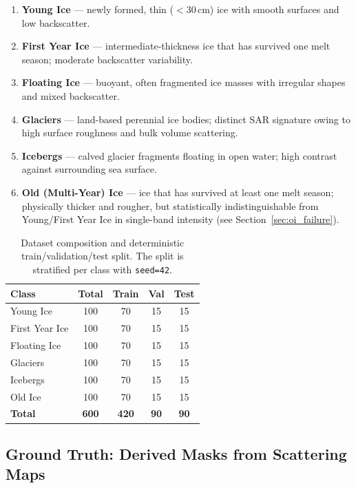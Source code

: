 \documentclass[remotesensing,article,accept,moreauthors,pdftex]{Definitions/mdpi}
\begin{document}
\begin{enumerate}[leftmargin=*,label=\arabic*.]
  \item \textbf{Young Ice} — newly formed, thin ($<$30\,cm) ice with smooth surfaces and low backscatter.
  \item \textbf{First Year Ice} — intermediate-thickness ice that has survived one melt season; moderate backscatter variability.
  \item \textbf{Floating Ice} — buoyant, often fragmented ice masses with irregular shapes and mixed backscatter.
  \item \textbf{Glaciers} — land-based perennial ice bodies; distinct SAR signature owing to high surface roughness and bulk volume scattering.
  \item \textbf{Icebergs} — calved glacier fragments floating in open water; high contrast against surrounding sea surface.
  \item \textbf{Old (Multi-Year) Ice} — ice that has survived at least one melt season; physically thicker and rougher, but statistically indistinguishable from Young/First Year Ice in single-band intensity (see Section~\ref{sec:oi_failure}).
\end{enumerate}

\begin{table}[H]
\centering
\caption{Dataset composition and deterministic train/validation/test split.
         The split is stratified per class with \texttt{seed=42}.}
\label{tab:dataset}
\begin{tabular}{lcccc}
\toprule
\textbf{Class} & \textbf{Total} & \textbf{Train} & \textbf{Val} & \textbf{Test} \\
\midrule
Young Ice       & 100 & 70 & 15 & 15 \\
First Year Ice  & 100 & 70 & 15 & 15 \\
Floating Ice    & 100 & 70 & 15 & 15 \\
Glaciers        & 100 & 70 & 15 & 15 \\
Icebergs        & 100 & 70 & 15 & 15 \\
Old Ice         & 100 & 70 & 15 & 15 \\
\midrule
\textbf{Total}  & \textbf{600} & \textbf{420} & \textbf{90} & \textbf{90} \\
\bottomrule
\end{tabular}
\end{table}

\subsection{Ground Truth: Derived Masks from Scattering Maps}
\label{sec:groundtruth}
\end{document}
